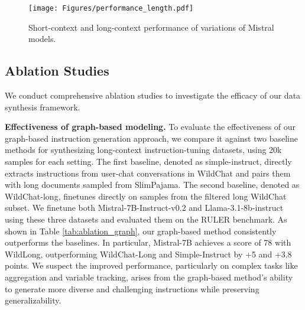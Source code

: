 \begin{wrapfigure}{r}{0.5\textwidth}
    \texttt{[image: Figures/performance\_length.pdf]}
    \caption{Short-context and long-context performance of variations of Mistral models. }
    \label{fig:performance_length}
\end{wrapfigure}


\subsection{Ablation Studies}
\label{mistral_analysis_rope}
We conduct comprehensive ablation studies to investigate the efficacy of our data synthesis framework.

\textbf{Effectiveness of graph-based modeling.}
To evaluate the effectiveness of our graph-based instruction generation approach, we compare it against two baseline methods for synthesizing long-context instruction-tuning datasets, using 20k samples for each setting. The first baseline, denoted as simple-instruct, directly extracts instructions from user-chat conversations in WildChat and pairs them with long documents sampled from SlimPajama. The second baseline, denoted as WildChat-long, finetunes directly on samples from the filtered long WildChat subset.
We finetune both Mistral-7B-Instruct-v0.2 and Llama-3.1-8b-instruct using these three datasets and evaluated them on the RULER benchmark. As shown in Table \ref{tab:ablation_graph}, our graph-based method consistently outperforms the baselines. In particular, Mistral-7B achieves a score of 78 with WildLong, outperforming WildChat-Long and Simple-Instruct by +5 and +3.8 points. We suspect the improved performance, particularly on complex tasks like aggregation and variable tracking, arises from the graph-based method’s ability to generate more diverse and challenging instructions while preserving generalizability. 



